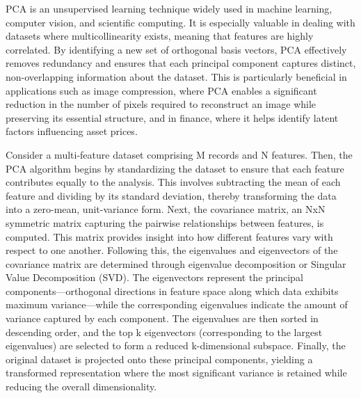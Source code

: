 PCA is an unsupervised learning technique widely used in machine learning, computer vision, and scientific computing. It is especially valuable in dealing with datasets where multicollinearity exists, meaning that features are highly correlated. By identifying a new set of orthogonal basis vectors, PCA effectively removes redundancy and ensures that each principal component captures distinct, non-overlapping information about the dataset\cite{pca-3}. This is particularly beneficial in applications such as image compression, where PCA enables a significant reduction in the number of pixels required to reconstruct an image while preserving its essential structure, and in finance, where it helps identify latent factors influencing asset prices.

Consider a multi-feature dataset comprising M records and N features. Then, the PCA algorithm begins by standardizing the dataset to ensure that each feature contributes equally to the analysis. This involves subtracting the mean of each feature and dividing by its standard deviation, thereby transforming the data into a zero-mean, unit-variance form. Next, the covariance matrix, an NxN symmetric matrix capturing the pairwise relationships between features, is computed. This matrix provides insight into how different features vary with respect to one another. Following this, the eigenvalues and eigenvectors of the covariance matrix are determined through eigenvalue decomposition or Singular Value Decomposition (SVD). The eigenvectors represent the principal components—orthogonal directions in feature space along which data exhibits maximum variance—while the corresponding eigenvalues indicate the amount of variance captured by each component. The eigenvalues are then sorted in descending order, and the top k eigenvectors (corresponding to the largest eigenvalues) are selected to form a reduced k-dimensional subspace. Finally, the original dataset is projected onto these principal components, yielding a transformed representation where the most significant variance is retained while reducing the overall dimensionality.

